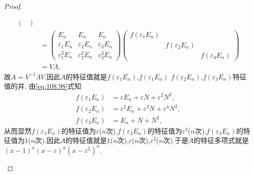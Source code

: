 \documentclass[../../main.tex]{subfiles}
\begin{document}
\begin{proof}
\begin{enumerate}[(1)]
\begin{align*}
\begin{pmatrix}
\end{pmatrix} \\
&= \begin{pmatrix}
E_n & E_n & E_n\\
\varepsilon_1 E_n & \varepsilon_2 E_n & \varepsilon_3 E_n\\
\varepsilon_1^2 E_n & \varepsilon_2^2 E_n & \varepsilon_3^2 E_n
\end{pmatrix} \begin{pmatrix}
f(\varepsilon_1 E_n) & & \\
& f(\varepsilon_2 E_n) & \\
& & f(\varepsilon_3 E_n)
\end{pmatrix}\\
& = V\Lambda,
\end{align*}
故$A = V^{-1}\Lambda V$.因此$A$的特征值就是$f(\varepsilon_1 E_n)$,$f(\varepsilon_1 E_n)$ $f(\varepsilon_2 E_n)$,$f(\varepsilon_3 E_n)$特征值的并.
由\eqref{eq:108.98}式知
\begin{align*}
f(\varepsilon_1 E_n) &= \varepsilon E_n + \varepsilon N + \varepsilon^2 N^2, \\
f(\varepsilon_2 E_n) &= \varepsilon^2 E_n + \varepsilon^2 N + \varepsilon^4 N^2, \\
f(\varepsilon_3 E_n) &= E_n + N + N^2,
\end{align*}
从而显然$f(\varepsilon_1 E_n)$的特征值为$\varepsilon$($n$次),$f(\varepsilon_2 E_n)$的特征值为$\varepsilon^2$($n$次),$f(\varepsilon_3 E_n)$的特征值为$1$($n$次).因此$A$的特征值就是$1$($n$次),$\varepsilon$($n$次),$\varepsilon^2$($n$次).于是$A$的特征多项式就是$(x - 1)^n (x - \varepsilon)^n (x - \varepsilon^2)^n$.
\end{enumerate}
\end{proof}
\end{document}
